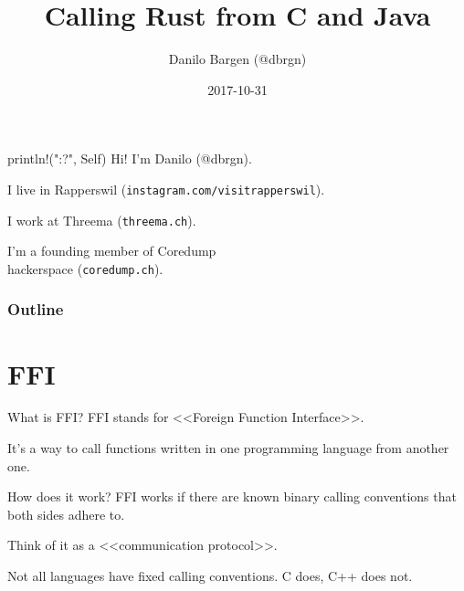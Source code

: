 \documentclass[aspectratio=1610,14pt,t]{beamer}
\title{Calling Rust from C and Java}
\date{2017-10-31}
\author{Danilo Bargen (@dbrgn)}
\institute{Rust Zürichsee Meetup}
\begin{document}
\maketitle


\begin{frame}[c]{println!("{:?}", Self)}
  Hi! I'm Danilo (@dbrgn).

  \pause

  I live in Rapperswil ({\small \texttt{instagram.com/visitrapperswil}}).

  \pause

  I work at Threema ({\small \texttt{threema.ch}}).

  \pause

  I'm a founding member of Coredump\\hackerspace ({\small \texttt{coredump.ch}}).
\end{frame}


\begin{frame}
	\frametitle{Outline}
	\setcounter{tocdepth}{1}
	\tableofcontents
\end{frame}



\section{FFI}

\begin{frame}[c]{What is FFI?}
	FFI stands for <<Foreign Function Interface>>.

  It's a way to call functions written in one programming language
  from another one.
\end{frame}

\begin{frame}[c]{How does it work?}
  FFI works if there are known binary calling conventions that both sides adhere to.

  Think of it as a <<communication protocol>>.

  Not all languages have fixed calling conventions. C does, C++ does not.
\end{frame}
\end{document}
